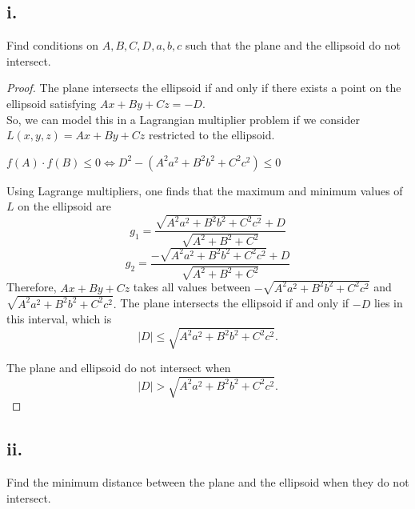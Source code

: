 \documentclass{article}
\begin{document}
\subsection*{i. }
Find conditions on $A, B, C, D, a, b, c$ such that the plane and the ellipsoid do not intersect.
\begin{proof}
The plane intersects the ellipsoid if and only if there exists a point on the ellipsoid satisfying $Ax+By+Cz = -D.$ \\
So, we can model this in a Lagrangian multiplier problem if we consider $L(x,y,z)=Ax+By+Cz$ restricted to the ellipsoid. 


    $f(A)\cdot f(B) \leq 0 \Leftrightarrow D^2-(A^2a^2+B^2b^2+C^2c^2) \leq 0$


Using Lagrange multipliers, one finds that the maximum and minimum
values of $L$ on the ellipsoid are
$$g_1=\frac{\sqrt{A^2a^2+B^2b^2+C^2c^2}+D}{\sqrt{A^2+B^2+C^2}}$$
$$g_2=\frac{-\sqrt{A^2a^2+B^2b^2+C^2c^2}+D}{\sqrt{A^2+B^2+C^2}}$$
Therefore, $Ax+By+Cz$ takes all values between $-\sqrt{A^2a^2+B^2b^2+C^2c^2}$ and $\sqrt{A^2a^2+B^2b^2+C^2c^2}.$
The plane intersects the ellipsoid if and only if $-D$ lies in this interval, which is
\[
|D| \le \sqrt{A^2a^2+B^2b^2+C^2c^2}.
\]

The plane and ellipsoid do not intersect when
\[
|D| > \sqrt{A^2a^2+B^2b^2+C^2c^2}.
\]

\end{proof}
\subsection*{ii. }
Find the minimum distance between the plane and the ellipsoid when they do not intersect.
\end{document}
